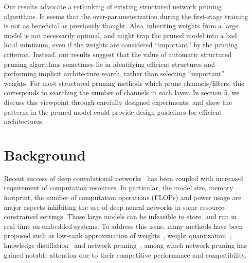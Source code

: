 Our results advocate a rethinking of existing structured network pruning algorithms. It seems that the over-parameterization during the first-stage training is not as beneficial as previously thought. Also, inheriting weights from a large model is not necessarily optimal, and might trap the pruned model into a bad local minimum, even if the weights are considered ``important'' by the pruning criterion. Instead, our results suggest that the value of automatic structured pruning algorithms sometimes lie in identifying efficient structures and performing implicit architecture search, rather than selecting ``important'' weights. For most structured pruning methods which prune channels/filters, this corresponds to searching the number of channels in each layer. In section 5, we discuss this viewpoint through carefully designed experiments, and show the patterns in the pruned model could provide design guidelines for efficient architectures.



\section{Background}
Recent success of deep convolutional networks~\cite{lecun1998gradient, imagenet,rcnn,fcn,resnet,He2017} has been coupled with increased requirement of computation resources. In particular, the model size, memory footprint, the number of computation operations (FLOPs) and power usage are major aspects inhibiting the use of deep neural networks in some resource-constrained settings. Those large models can be infeasible to store, and run in real time on embedded systems. To address this issue, many methods have been proposed such as low-rank approximation of weights~\cite{lowrank1, lowrank2}, weight quantization~\cite{binarynet, xnornet}, knowledge distillation~\cite{hinton2015distilling, fitnet} and network pruning~\cite{han2015learning,li2016pruning}, among which network pruning has gained notable attention due to their competitive performance and compatibility.


